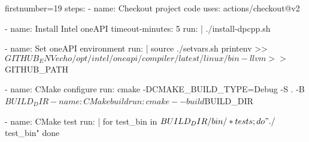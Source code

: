 \begin{bashcode*}{firstnumber=19}
    steps:
    - name: Checkout project code
      uses: actions/checkout@v2

    - name: Install Intel oneAPI
      timeout-minutes: 5
      run: |
        ./install-dpcpp.sh

    - name: Set oneAPI environment
      run: |
        source ./setvars.sh
        printenv >> $GITHUB_ENV
        echo /opt/intel/oneapi/compiler/latest/linux/bin-llvm >> $GITHUB_PATH

    - name: CMake configure
      run: cmake -DCMAKE_BUILD_TYPE=Debug -S . -B $BUILD_DIR

    - name: CMake build
      run: cmake --build $BUILD_DIR

    - name: CMake test
      run: |
        for test_bin in $BUILD_DIR/bin/*tests; do 
          "./$test_bin"
        done
\end{bashcode*}